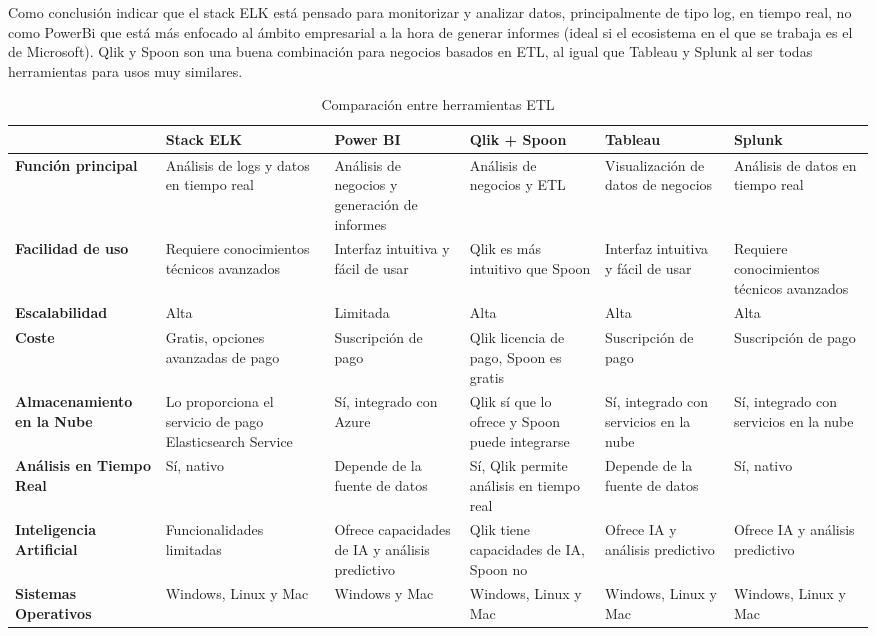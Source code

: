 Como conclusión indicar que el stack ELK está pensado para monitorizar y analizar datos, principalmente de tipo log, en tiempo real, no como PowerBi que está más enfocado al ámbito empresarial a la hora de generar informes (ideal si el ecosistema en el que se trabaja es el de Microsoft). Qlik y Spoon son una buena combinación para negocios basados en ETL, al igual que Tableau y Splunk al ser todas herramientas para usos muy similares.


\begin{table}[h]
\centering
\begin{tabularx}{\textwidth}{|X|X|X|X|X|X|}
\hline
 & \textbf{Stack ELK} & \textbf{Power BI} & \textbf{Qlik + Spoon} & \textbf{Tableau} & \textbf{Splunk} \\ \hline
\textbf{Función principal} & Análisis de logs y datos en tiempo real & Análisis de negocios y generación de informes & Análisis de negocios y ETL & Visualización de datos de negocios & Análisis de datos en tiempo real \\ \hline
\textbf{Facilidad de uso} & Requiere conocimientos técnicos avanzados & Interfaz intuitiva y fácil de usar & Qlik es más intuitivo que Spoon & Interfaz intuitiva y fácil de usar & Requiere conocimientos técnicos avanzados \\ \hline
\textbf{Escalabilidad} & Alta & Limitada & Alta & Alta & Alta \\ \hline
\textbf{Coste} & Gratis, opciones avanzadas de pago & Suscripción de pago & Qlik licencia de pago, Spoon es gratis & Suscripción de pago & Suscripción de pago \\ \hline
\textbf{Almacenamiento en la Nube} & Lo proporciona el servicio de pago Elasticsearch Service & Sí, integrado con Azure & Qlik sí que lo ofrece y Spoon puede integrarse & Sí, integrado con servicios en la nube & Sí, integrado con servicios en la nube \\ \hline
\textbf{Análisis en Tiempo Real} & Sí, nativo & Depende de la fuente de datos & Sí, Qlik permite análisis en tiempo real & Depende de la fuente de datos & Sí, nativo \\ \hline
\textbf{Inteligencia Artificial} & Funcionalidades limitadas & Ofrece capacidades de IA y análisis predictivo & Qlik tiene capacidades de IA, Spoon no & Ofrece IA y análisis predictivo & Ofrece IA y análisis predictivo \\ \hline
\textbf{Sistemas Operativos} & Windows, Linux y Mac & Windows y Mac & Windows, Linux y Mac & Windows, Linux y Mac & Windows, Linux y Mac \\
\end{tabularx}
\caption{Comparación entre herramientas ETL}
\label{tab:comparacion}
\end{table}
